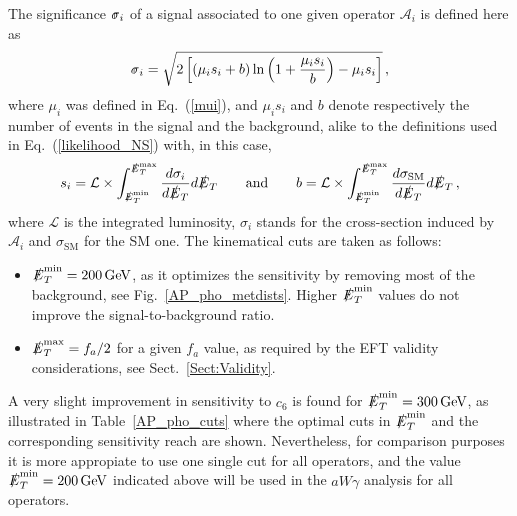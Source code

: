 \documentclass[11pt]{article}
\newcommand{\Bsigma}{\mbox{$\hspace{0.12em}\shortmid\hspace{-0.62em}\sigma$}}
\newcommand{\s}{\sigma}
\newcommand{\A}{\mathcal{A}}
\renewcommand{\L}{\mathcal{L}}
\newcommand{\ETmiss}{\slashed{E}_T}
\newcommand{\beq}{\begin{equation}}
\newcommand{\eeq}{\end{equation}}
\renewcommand{\[}{\begin{equation}}
\renewcommand{\]}{\end{equation}}
\begin{document}
The significance $\Bsigma_i$ of a signal associated to one given operator $\A_i$ is defined here as~\cite{Cowan:2010js} 
%
\[ \Bsigma_i=\sqrt{2\left[(\mu_i s_i+b)
\ln\left(1+\frac{\mu_i s_i}{b}\right)
-\mu_i s_i\right]}\,,\label{Asimov_sensitivity}\]
%
where $\mu_i$ was defined in Eq.~(\ref{mui}), and $\mu_i s_i$ and  $b$ denote respectively the number of events in the signal and the background, 
alike to the definitions used  in Eq.~(\ref{likelihood_NS}) with, in this case, 
%
\beq
s_i= \L\times
 \int_{\ETmiss^{\text{min}}}^{\ETmiss^\text{max}}\frac{d\s_i}{d\ETmiss}d\ETmiss \qquad \text{and} \qquad
 b=\L\times\int_{\ETmiss^{\text{min}}}^{\ETmiss^\text{max}}\frac{d\s_{\text{SM}}}{d\ETmiss}d\ETmiss\,,
 \label{sib}
\eeq
where $\L$ is the integrated luminosity, $\sigma_i$ stands for the cross-section induced by $\A_i$ and $\s_{\text{SM}}$ for the SM one.   
The kinematical cuts are taken as follows:
\begin{itemize}
\item $\ETmiss^\mathrm{min}=\unit[200]{GeV}$, as it optimizes the sensitivity by removing most of the background, see Fig.~\ref{AP_pho_metdists}.
Higher $\ETmiss^\mathrm{min}$ values do not improve the signal-to-background ratio.
\item $\ETmiss^\mathrm{max}={f_a}/{2}$ for a given $f_a$ value, as required by the EFT validity considerations, see Sect.~\ref{Sect:Validity}. 
\end{itemize} 
A very slight improvement in sensitivity to $c_6$ is 
found for $\ETmiss^\mathrm{min} = \unit[300]{GeV}$, as illustrated in Table~\ref{AP_pho_cuts} where the optimal cuts in $\ETmiss^\mathrm{min}$ and  the 
corresponding sensitivity reach are shown. Nevertheless, for comparison purposes it is more appropiate to use one single cut for all operators, 
and the value $\ETmiss^\mathrm{min}=\unit[200]{GeV}$ indicated above will be used in the $aW\gamma$ analysis for all operators. 
 
\end{document}
